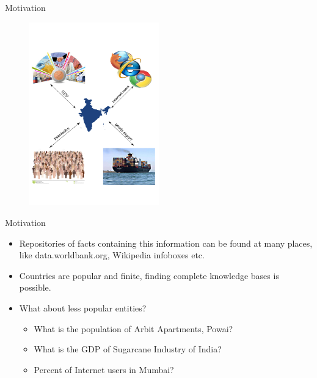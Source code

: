\documentclass{beamer}
\begin{document}
\begin{frame}{Motivation}

    \begin{figure}
    \centering
    \includegraphics[width = 0.5\textwidth]{images/motivation}
  \end{figure}
 
\end{frame}


\begin{frame}{Motivation}
 
 \begin{itemize}
  \item Repositories of facts containing this information can be found at many places, like data.worldbank.org, Wikipedia infoboxes etc. \pause
  \item Countries are popular and finite, finding complete knowledge bases is possible. \pause
  \item What about less popular entities?  \pause
    \begin{itemize}
      \item What is the population of Arbit Apartments, Powai? \pause
      \item What is the GDP of Sugarcane Industry of India? \pause
      \item Percent of Internet users in Mumbai? 
    \end{itemize}
 \end{itemize} 
\end{frame}
\end{document}
